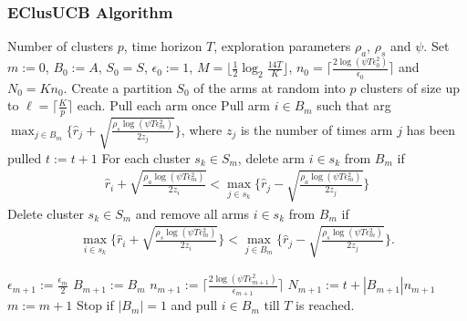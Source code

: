 \documentclass{beamer}
\begin{document}
\begin{frame}[allowframebreaks]
\frametitle{EClusUCB Algorithm}

\begin{algorithmic}
 Number of clusters $p$, time horizon $T$, exploration parameters $\rho_a$, $\rho_s$ and $\psi$.
 Set $m:=0$, $B_{0}:=A$, $S_0 = S$, $\epsilon_{0}:=1$, $M=\big \lfloor \frac{1}{2}\log_{2} \frac{14T}{K}\big\rfloor$, $n_{0}=\bigg\lceil\frac{2\log{(\psi T\epsilon_{0}^{2})}}{\epsilon_{0}}\bigg\rceil$ and  $N_{0}=Kn_{0}$.
\State Create a partition $S_0$ of the arms at random into $p$ clusters of size up to $\ell=\bigg\lceil \frac{K}{p} \bigg\rceil$ each.
\State Pull each arm once
\State Pull arm $i\in B_m$ such that arg$\max_{j\in B_{m}}\bigg\lbrace \hat{r}_{j} + \sqrt{\frac{\rho_{s}\log{(\psi T\epsilon_{m}^{2})}}{2 z_{j}}} \bigg\rbrace$, where $z_j$ is the number of times arm $j$ has been pulled
\State $t:=t+1$
\ArmElim
\State For each cluster $s_k \in S_{m}$, delete arm ${i}\in s_{k}$ from $B_{m}$ if
\begin{align*}
\hat{r}_{i} + \sqrt{\frac{\rho_{a}\log{(\psi T\epsilon_{m}^{2})}}{2 z_{i}}}  < \max_{{j}\in s_{k}}\bigg\lbrace\hat{r}_{j} -\sqrt{\frac{\rho_{a}\log{(\psi T\epsilon_{m}^{2})}}{2 z_{j}}} \bigg\rbrace
\end{align*}
\EndArmElim
\ClusElim
\State Delete cluster $s_{k}\in S_{m}$ and remove all arms $i\in s_{k}$ from $B_{m}$ if 
\begin{align*}
 \max_{{i}\in s_{k}}\bigg\lbrace\hat{r}_{i} + \sqrt{\frac{\rho_{s}\log{(\psi T\epsilon_{m}^{2})}}{2 z_{i}}}\bigg\rbrace 
 < \max_{{j}\in B_{m}} \bigg\lbrace\hat{r}_{j} - \sqrt{\frac{\rho_{s} \log{(\psi T\epsilon_{m}^{2})}}{2 z_{j}}}\bigg\rbrace.
\end{align*}
\EndClusElim

\State $\epsilon_{m+1}:=\frac{\epsilon_{m}}{2}$\vspace{0.5ex}
\State $B_{m+1}:=B_{m}$
\State $n_{m+1}:=\bigg\lceil\frac{2\log{(\psi T\epsilon_{m+1}^{2})}}{\epsilon_{m+1}}\bigg\rceil$
\State $N_{m+1}:=t+|B_{m+1}| n_{m+1}$
\State $m:=m+1$
\State Stop if $|B_{m}|=1$ and pull ${i}\in B_{m}$ till $T$ is reached.
\EndIf
\EndFor
\end{algorithmic}

\end{frame}
\end{document}
